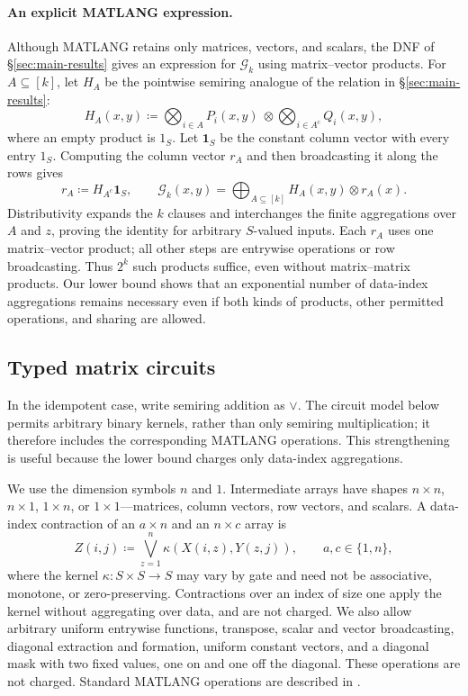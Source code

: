 \paragraph{An explicit MATLANG expression.}
Although MATLANG retains only matrices, vectors, and scalars,
the DNF of \S\ref{sec:main-results} gives an expression for
$\mathcal G_k$ using matrix--vector products. For $A\subseteq[k]$,
let $H_A$ be the pointwise semiring analogue of the relation in
\S\ref{sec:main-results}:
\[
 H_A(x,y)\coloneqq
 \bigotimes_{i\in A}P_i(x,y)\ \otimes
 \bigotimes_{i\in A^c}Q_i(x,y),
\]
where an empty product is $1_S$.
Let $\mathbf 1_S$ be the constant column vector with every entry
$1_S$. Computing the column vector $r_A$ and then broadcasting it
along the rows gives
\begin{equation}\label{eq:matlang-dnf}
 r_A\coloneqq H_{A^c}\mathbf 1_S,\qquad
 \mathcal G_k(x,y)=\bigoplus_{A\subseteq[k]}
       H_A(x,y)\otimes r_A(x).
\end{equation}
Distributivity expands the $k$ clauses and interchanges the finite
aggregations over $A$ and $z$, proving the identity for arbitrary
$S$-valued inputs. Each $r_A$ uses one matrix--vector product;
all other steps are entrywise operations or row broadcasting.
Thus $2^k$ such products suffice, even without matrix--matrix
products. Our lower bound shows that an exponential number of
data-index aggregations remains necessary even if both kinds of
products, other permitted operations, and sharing are allowed.

\subsection{Typed matrix circuits}\label{sec:typed}
In the idempotent case, write semiring addition as $\vee$. The circuit
model below permits arbitrary binary kernels, rather than only
semiring multiplication; it therefore includes the corresponding
MATLANG operations. This strengthening is useful because the lower
bound charges only data-index aggregations.

We use the dimension symbols $n$ and $1$. Intermediate arrays have
shapes $n\times n$, $n\times1$, $1\times n$, or $1\times1$---matrices,
column vectors, row vectors, and scalars. A data-index contraction
of an $a\times n$ and an $n\times c$ array is
\[
 Z(i,j)\coloneqq\bigvee_{z=1}^n\kappa(X(i,z),Y(z,j)),
 \qquad a,c\in\{1,n\},
\]
where the kernel $\kappa:S\times S\to S$ may vary by gate and
need not be associative, monotone, or zero-preserving.
Contractions over an index of size one apply the kernel without
aggregating over data, and are not charged.
We also allow arbitrary uniform entrywise functions, transpose,
scalar and vector broadcasting, diagonal extraction and formation,
uniform constant vectors, and a diagonal mask with two fixed values,
one on and one off the diagonal. These operations are not charged.
Standard MATLANG operations are described in
\citep{brijder2019tods,brijder2022}.

